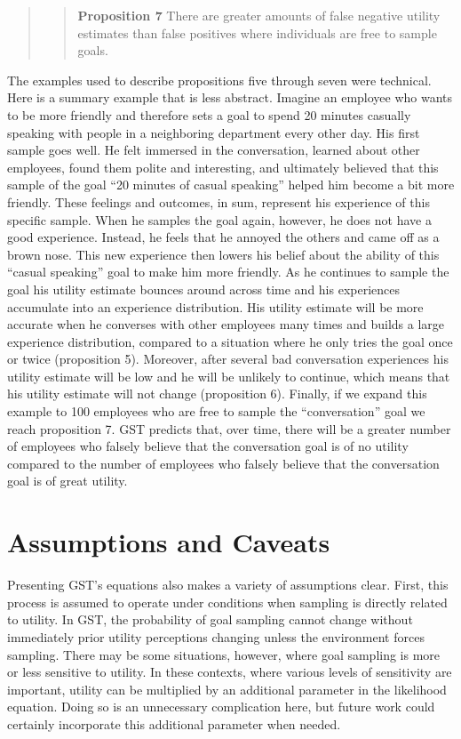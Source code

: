 \documentclass[english,,man]{apa6}
\theoremstyle{definition}
\theoremstyle{definition}
\theoremstyle{definition}
\theoremstyle{remark}
\begin{document}
\begin{quote}
\begin{quote}
\textbf{Proposition 7} There are greater amounts of false negative
utility estimates than false positives where individuals are free to
sample goals.
\end{quote}
\end{quote}

The examples used to describe propositions five through seven were
technical. Here is a summary example that is less abstract. Imagine an
employee who wants to be more friendly and therefore sets a goal to
spend 20 minutes casually speaking with people in a neighboring
department every other day. His first sample goes well. He felt immersed
in the conversation, learned about other employees, found them polite
and interesting, and ultimately believed that this sample of the goal
``20 minutes of casual speaking'' helped him become a bit more friendly.
These feelings and outcomes, in sum, represent his experience of this
specific sample. When he samples the goal again, however, he does not
have a good experience. Instead, he feels that he annoyed the others and
came off as a brown nose. This new experience then lowers his belief
about the ability of this ``casual speaking'' goal to make him more
friendly. As he continues to sample the goal his utility estimate
bounces around across time and his experiences accumulate into an
experience distribution. His utility estimate will be more accurate when
he converses with other employees many times and builds a large
experience distribution, compared to a situation where he only tries the
goal once or twice (proposition 5). Moreover, after several bad
conversation experiences his utility estimate will be low and he will be
unlikely to continue, which means that his utility estimate will not
change (proposition 6). Finally, if we expand this example to 100
employees who are free to sample the ``conversation'' goal we reach
proposition 7. GST predicts that, over time, there will be a greater
number of employees who falsely believe that the conversation goal is of
no utility compared to the number of employees who falsely believe that
the conversation goal is of great utility.

\hypertarget{assumptions-and-caveats}{%
\section{Assumptions and Caveats}\label{assumptions-and-caveats}}

Presenting GST's equations also makes a variety of assumptions clear.
First, this process is assumed to operate under conditions when sampling
is directly related to utility. In GST, the probability of goal sampling
cannot change without immediately prior utility perceptions changing
unless the environment forces sampling. There may be some situations,
however, where goal sampling is more or less sensitive to utility. In
these contexts, where various levels of sensitivity are important,
utility can be multiplied by an additional parameter in the likelihood
equation. Doing so is an unnecessary complication here, but future work
could certainly incorporate this additional parameter when needed.
\end{document}
